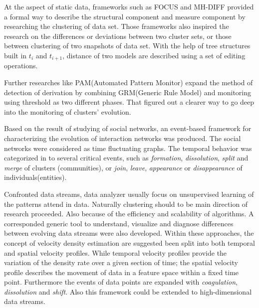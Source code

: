 \documentclass{sig-alternate}
\begin{document}
At the aspect of static data, frameworks such as FOCUS\cite{GANTI:datachar} and MH-DIFF\cite{CHAWATHE:changedetection} provided a formal way to describe the structural component and measure component by researching the clustering of data set. Those frameworks also inspired the research on the differences or deviations between two cluster sets, or those between clustering of two snapshots of data set. With the help of tree structures built in $t_i$ and $t_{i+1}$, distance of two models are described using a set of editing operations.

Further researches like PAM(Automated Pattern Monitor)\cite{BARON:webusagepattern} expand the method of detection of derivation by combining GRM(Generic Rule Model) and monitoring using threshold as two different phases. That figured out a clearer way to go deep into the monitoring of clusters' evolution.

Based on the result of studying of social networks, an event-based framework\cite{FALKOWSKI:socialnet}\cite{ASUR:event} for characterizing the evolution of interaction networks was produced. The social networks were considered as time fluctuating graphs. The temporal behavior was categorized in to several critical events, such as \emph{formation}, \emph{dissolution}, \emph{split} and \emph{merge} of clusters (communities), or \emph{join}, \emph{leave}, \emph{appearance} or \emph{disappearance} of individuals(entities).

Confronted data streams, data analyzer usually focus on unsupervised learning of the patterns attend in data. Naturally clustering should to be main direction of research proceeded\cite{AGGARWAL:diagnosis}\cite{AGGARWAL:framework}\cite{CHEN:change}\cite{OCALLAGHAN:highquality}\cite{ELNEKAVE}\cite{KALNIS:movingclusters}\cite{LI:entropy}. Also because of the efficiency and scalability of algorithms. A corresponded generic tool to understand, visualize and diagnose differences between evolving data streams were also developed. Within these approaches, the concept of velocity density estimation are suggested been split into both temporal and spatial velocity profiles. While temporal velocity profiles provide the variation of the density rate over a given section of time; the spatial velocity profile describes the movement of data in a feature space within a fixed time point. Furthermore the events of data points are expanded with \emph{coagulation}, \emph{dissolution} and \emph{shift}. Also this framework could be extended to high-dimensional data streams.
\end{document}

